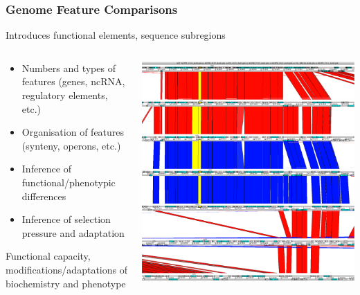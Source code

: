 \begin{frame}
  \frametitle{Genome Feature Comparisons}
  Introduces functional elements, sequence subregions
  \begin{columns}
    \begin{column}{5.5cm}
      \begin{itemize}
        \item Numbers and types of features (genes, ncRNA, regulatory elements, etc.)
        \item Organisation of features (synteny, operons, etc.)
        \item Inference of functional/phenotypic differences
        \item Inference of selection pressure and adaptation
      \end{itemize}  
      Functional capacity, modifications/adaptations of biochemistry and phenotype  
    \end{column}
    \begin{column}{5cm}
      \includegraphics[width=1\textwidth]{images/t6ss}    
    \end{column}
  \end{columns}
\end{frame}